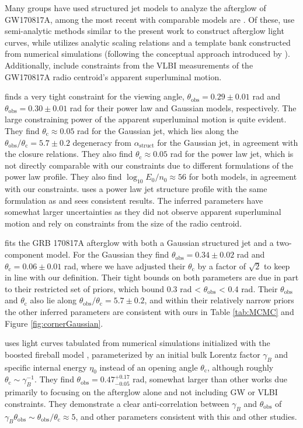 \documentclass[twocolumn]{aastex62}
\newcommand{\gwbns}{GW170817A}
\newcommand{\grbbns}{GRB 170817A}
\newcommand{\thobs}{\ensuremath{\theta_{\mathrm{obs}}}}
\newcommand{\thC}{\ensuremath{\theta_{\mathrm{c}}}}
\begin{document}
Many groups have used structured jet models to analyze the afterglow of \gwbns{}, among the most recent with comparable models are \citet{Hotokezaka:2018aa, Ghirlanda:2019aa, Lamb:2019aa, Wu:2018aa}.  Of these, \citet{Hotokezaka:2018aa, Ghirlanda:2019aa, Lamb:2019aa} use semi-analytic methods similar to the present work to construct afterglow light curves, while \citet{Wu:2018aa} utilizes analytic scaling relations and a template bank constructed from numerical simulations (following the conceptual approach introduced by \citet{van-Eerten:2012ac}).  Additionally, \citet{Hotokezaka:2018aa, Ghirlanda:2019aa} include constraints from the VLBI measurements of the \gwbns{} radio centroid's apparent superluminal motion.

\citet{Hotokezaka:2018aa} finds a very tight constraint for the viewing angle, $\thobs = 0.29 \pm 0.01$ rad and $\thobs = 0.30 \pm 0.01$ rad for their power law and Gaussian models, respectively.  The large constraining power of the apparent superluminal motion is quite evident.  They find $\thC \approx 0.05$ rad for the Gaussian jet, which lies along the $\thobs/\thC = 5.7\pm 0.2$ degeneracy from $\alpha_{\mathrm{struct}}$ for the Gaussian jet, in agreement with the closure relations.  They also find $\thC \approx 0.05$ rad for the power law jet, which is not directly comparable with our constraints due to different formulations of the power law profile.  They also find $\log_{10} E_0 / n_0 \approx 56$ for both models, in agreement with our constraints.  \citet{Ghirlanda:2019aa} uses a power law jet structure profile with the same formulation as \citet{Hotokezaka:2018aa} and sees consistent results.  The inferred parameters have somewhat larger uncertainties as they did not observe apparent superluminal motion and rely on constraints from the size of the radio centroid.

\citet{Lamb:2019aa} fits the \grbbns{} afterglow with both a Gaussian structured jet and a two-component model.  For the Gaussian they find $\thobs = 0.34 \pm 0.02$ rad and $\thC = 0.06 \pm 0.01$ rad, where we have adjusted their $\thC$ by a factor of $\sqrt{2}$ to keep in line with our definition.  Their tight bounds on both parameters are due in part to their restricted set of priors, which bound 0.3 rad < $\thobs$ < 0.4 rad.  Their $\thobs$ and $\thC$ also lie along $\thobs/\thC = 5.7 \pm 0.2$, and within their relatively narrow priors the other inferred parameters are consistent with ours in Table \ref{tab:MCMC} and Figure \ref{fig:cornerGaussian}.

\citet{Wu:2018aa} uses light curves tabulated from numerical simulations initialized with the boosted fireball model \citep{Duffell:2013aa}, parameterized by an initial bulk Lorentz factor $\gamma_B$ and specific internal energy $\eta_0$ instead of an opening angle $\thC$, although roughly $\thC \sim \gamma_B^{-1}$.  They find $\thobs = 0.47^{+0.17}_{-0.05}$ rad, somewhat larger than other works due primarily to focusing on the afterglow alone and not including GW or VLBI constraints.  They demonstrate a clear anti-correlation between $\gamma_B$ and $\thobs$ of $\gamma_B \thobs  \sim \thobs/\thC \approx 5$, and other parameters consistent with this and other studies.
\end{document}
